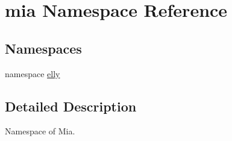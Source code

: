 \hypertarget{namespacemia}{\section{mia Namespace Reference}
\label{namespacemia}
}
\subsection*{Namespaces}
\begin{DoxyCompactItemize}
\item 
namespace \hyperlink{namespacemia_1_1elly}{elly}
\end{DoxyCompactItemize}


\subsection{Detailed Description}
Namespace of Mia. 